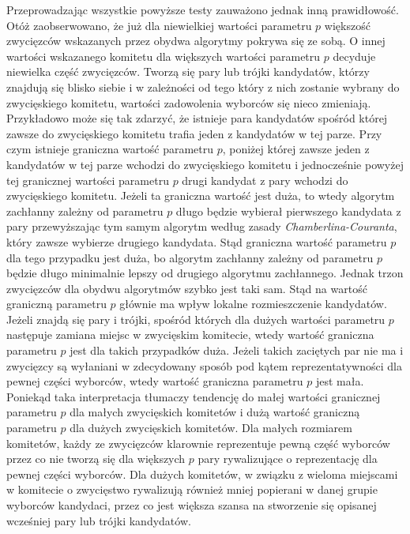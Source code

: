 \documentclass[pdflatex,11pt]{../aghdoc_version2}
\begin{document}
Przeprowadzając wszystkie powyższe testy zauważono jednak inną prawidłowość. Otóż zaobserwowano, że już dla niewielkiej wartości parametru $p$ większość zwycięzców wskazanych przez obydwa algorytmy pokrywa się ze sobą. O innej wartości wskazanego komitetu dla większych wartości parametru $p$ decyduje niewielka część zwycięzców. Tworzą się pary lub trójki kandydatów, którzy znajdują się blisko siebie i w zależności od tego który z nich zostanie wybrany do zwycięskiego komitetu, wartości zadowolenia wyborców się nieco zmieniają. Przykładowo może się tak zdarzyć, że istnieje para kandydatów spośród której zawsze do zwycięskiego komitetu trafia jeden z kandydatów w tej parze. Przy czym istnieje graniczna wartość parametru $p$, poniżej której zawsze jeden z kandydatów w tej parze wchodzi do zwycięskiego komitetu i jednocześnie powyżej tej granicznej wartości parametru $p$ drugi kandydat z pary wchodzi do zwycięskiego komitetu. Jeżeli ta graniczna wartość jest duża, to wtedy algorytm zachłanny zależny od parametru $p$ długo będzie wybierał pierwszego kandydata z pary
przewyższając tym samym algorytm według zasady \textit{Chamberlina-Couranta}, który zawsze wybierze drugiego
kandydata. Stąd graniczna wartość parametru $p$ dla tego przypadku jest duża, bo algorytm zachłanny zależny od parametru $p$ będzie długo minimalnie lepszy od drugiego algorytmu zachłannego. Jednak trzon zwycięzców dla obydwu algorytmów szybko jest taki sam. Stąd na wartość graniczną parametru $p$ głównie ma wpływ lokalne rozmieszczenie kandydatów. Jeżeli znajdą się pary i trójki, spośród których dla dużych wartości parametru $p$ następuje zamiana miejsc w zwycięskim komitecie, wtedy wartość graniczna parametru $p$ jest dla takich przypadków duża. Jeżeli takich zaciętych par nie ma i zwycięzcy są wyłaniani w zdecydowany sposób pod kątem reprezentatywności dla pewnej części wyborców, wtedy wartość graniczna parametru $p$ jest mała. Poniekąd taka interpretacja tłumaczy tendencję do małej wartości granicznej parametru $p$ dla małych zwycięskich komitetów i dużą wartość graniczną parametru $p$ dla dużych zwycięskich komitetów. Dla małych rozmiarem komitetów, każdy ze zwycięzców klarownie reprezentuje pewną część wyborców przez co nie tworzą się dla większych $p$ pary rywalizujące o reprezentację dla pewnej części wyborców. Dla dużych komitetów, w związku z wieloma miejscami w komitecie o zwycięstwo rywalizują również mniej popierani w danej grupie wyborców kandydaci, przez co jest większa szansa na stworzenie się opisanej wcześniej pary lub trójki kandydatów.
\end{document}
